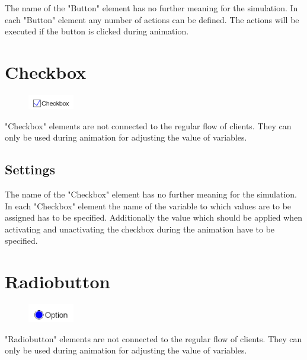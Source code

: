 The name of the "Button" element has no further meaning for the simulation.
In each "Button" element any number of actions can be defined. The actions will
be executed if the button is clicked during animation.


\section{Checkbox}
\label{ref:ModelElementInteractiveCheckbox}

\begin{figure}
\vspace{-22pt}
\includegraphics[width=2cm]{imageModelElementInteractiveCheckbox.png}
\vspace{-22pt}
\end{figure}

"Checkbox" elements are not connected to the regular flow of clients.
They can only be used during animation for adjusting the value of
variables.

\subsection*{Settings}

The name of the "Checkbox" element has no further meaning for the simulation.
In each "Checkbox" element the name of the variable to which values are to
be assigned has to be specified. Additionally the value which should be
applied when activating and unactivating the checkbox during the animation
have to be specified.  


\section{Radiobutton}
\label{ref:ModelElementInteractiveRadiobutton}

\begin{figure}
\vspace{-22pt}
\includegraphics[width=2cm]{imageModelElementInteractiveRadiobutton.png}
\vspace{-22pt}
\end{figure}

"Radiobutton" elements are not connected to the regular flow of clients.
They can only be used during animation for adjusting the value of
variables.

